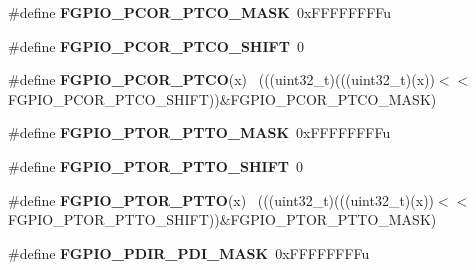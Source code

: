 \begin{DoxyCompactItemize}
\item 
\hypertarget{group___f_g_p_i_o___register___masks_ga07265e812fba9f953394d6e9dfe82aab}{}\#define {\bfseries F\+G\+P\+I\+O\+\_\+\+P\+C\+O\+R\+\_\+\+P\+T\+C\+O\+\_\+\+M\+A\+S\+K}~0x\+F\+F\+F\+F\+F\+F\+F\+Fu\label{group___f_g_p_i_o___register___masks_ga07265e812fba9f953394d6e9dfe82aab}

\item 
\hypertarget{group___f_g_p_i_o___register___masks_gaa72cbc41d1494dfea7662eede74ee2a1}{}\#define {\bfseries F\+G\+P\+I\+O\+\_\+\+P\+C\+O\+R\+\_\+\+P\+T\+C\+O\+\_\+\+S\+H\+I\+F\+T}~0\label{group___f_g_p_i_o___register___masks_gaa72cbc41d1494dfea7662eede74ee2a1}

\item 
\hypertarget{group___f_g_p_i_o___register___masks_ga8854e47dc40f1621f212f1e034d175e9}{}\#define {\bfseries F\+G\+P\+I\+O\+\_\+\+P\+C\+O\+R\+\_\+\+P\+T\+C\+O}(x)                                          ~(((uint32\+\_\+t)(((uint32\+\_\+t)(x))$<$$<$F\+G\+P\+I\+O\+\_\+\+P\+C\+O\+R\+\_\+\+P\+T\+C\+O\+\_\+\+S\+H\+I\+F\+T))\&F\+G\+P\+I\+O\+\_\+\+P\+C\+O\+R\+\_\+\+P\+T\+C\+O\+\_\+\+M\+A\+S\+K)\label{group___f_g_p_i_o___register___masks_ga8854e47dc40f1621f212f1e034d175e9}

\item 
\hypertarget{group___f_g_p_i_o___register___masks_gab0e5427135589fc107fe4b465e5c767f}{}\#define {\bfseries F\+G\+P\+I\+O\+\_\+\+P\+T\+O\+R\+\_\+\+P\+T\+T\+O\+\_\+\+M\+A\+S\+K}~0x\+F\+F\+F\+F\+F\+F\+F\+Fu\label{group___f_g_p_i_o___register___masks_gab0e5427135589fc107fe4b465e5c767f}

\item 
\hypertarget{group___f_g_p_i_o___register___masks_gae2127729a1021dc8d34d55a758102213}{}\#define {\bfseries F\+G\+P\+I\+O\+\_\+\+P\+T\+O\+R\+\_\+\+P\+T\+T\+O\+\_\+\+S\+H\+I\+F\+T}~0\label{group___f_g_p_i_o___register___masks_gae2127729a1021dc8d34d55a758102213}

\item 
\hypertarget{group___f_g_p_i_o___register___masks_ga2f7a3e85c47496e6cfcc02acf793ae45}{}\#define {\bfseries F\+G\+P\+I\+O\+\_\+\+P\+T\+O\+R\+\_\+\+P\+T\+T\+O}(x)                                          ~(((uint32\+\_\+t)(((uint32\+\_\+t)(x))$<$$<$F\+G\+P\+I\+O\+\_\+\+P\+T\+O\+R\+\_\+\+P\+T\+T\+O\+\_\+\+S\+H\+I\+F\+T))\&F\+G\+P\+I\+O\+\_\+\+P\+T\+O\+R\+\_\+\+P\+T\+T\+O\+\_\+\+M\+A\+S\+K)\label{group___f_g_p_i_o___register___masks_ga2f7a3e85c47496e6cfcc02acf793ae45}

\item 
\hypertarget{group___f_g_p_i_o___register___masks_ga49077fe6b4cbd499bfa84f4b4c1be74c}{}\#define {\bfseries F\+G\+P\+I\+O\+\_\+\+P\+D\+I\+R\+\_\+\+P\+D\+I\+\_\+\+M\+A\+S\+K}~0x\+F\+F\+F\+F\+F\+F\+F\+Fu\label{group___f_g_p_i_o___register___masks_ga49077fe6b4cbd499bfa84f4b4c1be74c}


\end{DoxyCompactItemize}
